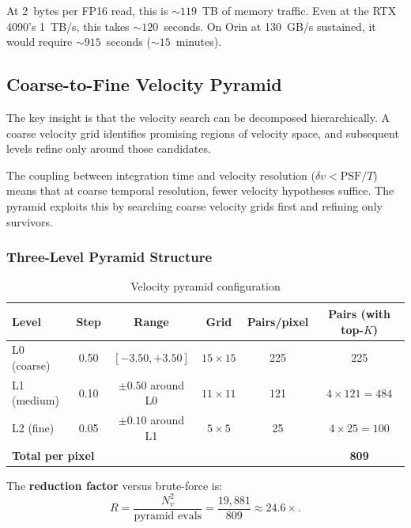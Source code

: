 \documentclass[11pt,letterpaper]{article}
\begin{document}
At 2~bytes per FP16 read, this is ${\sim}119$~TB of memory traffic.
Even at the RTX 4090's 1~TB/s, this takes ${\sim}120$~seconds.
On Orin at 130~GB/s sustained, it would require ${\sim}915$~seconds
(${\sim}15$~minutes).

\subsection{Coarse-to-Fine Velocity Pyramid}
\label{sec:pyramid}

The key insight is that the velocity search can be decomposed hierarchically.
A coarse velocity grid identifies promising regions of velocity space, and
subsequent levels refine only around those candidates.

\begin{keyinsight}
The coupling between integration time and velocity resolution
($\delta v < \text{PSF}/T$) means that at coarse temporal resolution,
fewer velocity hypotheses suffice. The pyramid exploits this by searching
coarse velocity grids first and refining only survivors.
\end{keyinsight}

\subsubsection{Three-Level Pyramid Structure}

\begin{table}[h]
\centering
\caption{Velocity pyramid configuration}
\label{tab:pyramid}
\begin{tabular}{lccccc}
\toprule
\textbf{Level} & \textbf{Step} & \textbf{Range} & \textbf{Grid} &
\textbf{Pairs/pixel} & \textbf{Pairs (with top-$K$)} \\
\midrule
L0 (coarse)  & 0.50 & $[-3.50, +3.50]$      & $15\times 15$ & 225 & 225 \\
L1 (medium)  & 0.10 & $\pm 0.50$ around L0   & $11\times 11$ & 121 & $4 \times 121 = 484$ \\
L2 (fine)    & 0.05 & $\pm 0.10$ around L1   & $5\times 5$   & 25  & $4 \times 25 = 100$ \\
\midrule
\multicolumn{5}{l}{\textbf{Total per pixel}} & \textbf{809} \\
\bottomrule
\end{tabular}
\end{table}

The \textbf{reduction factor} versus brute-force is:
\begin{equation}
    R = \frac{N_{v}^2}{\text{pyramid evals}}
    = \frac{19{,}881}{809}
    \approx 24.6\times.
    \label{eq:reduction}
\end{equation}
\end{document}
